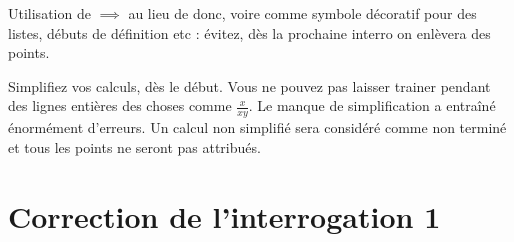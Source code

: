 Utilisation de \og $\implies$\fg{} au lieu de \og donc\fg, voire comme symbole décoratif pour des listes, débuts de définition etc : évitez, dès la prochaine interro on enlèvera des points.

Simplifiez vos calculs, dès le début. Vous ne pouvez pas laisser trainer pendant des lignes entières des choses comme $\frac{x}{xy}$. Le manque de simplification a entraîné énormément d'erreurs. 
Un calcul non simplifié sera considéré comme non terminé et tous les points ne seront pas attribués.

\newpage
\section*{Correction de l'interrogation 1}




